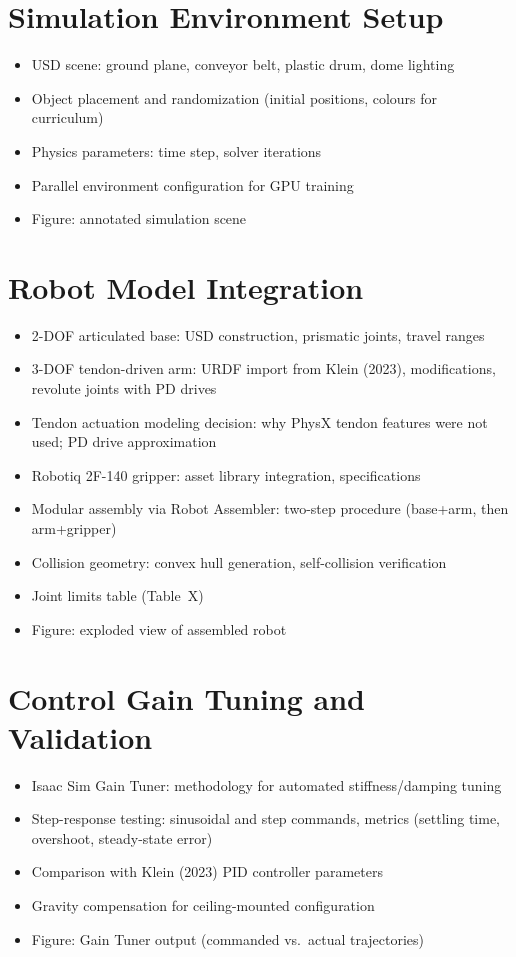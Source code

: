 \section{Simulation Environment Setup}
\begin{itemize}
    \item USD scene: ground plane, conveyor belt, plastic drum, dome lighting
    \item Object placement and randomization (initial positions, colours for curriculum)
    \item Physics parameters: time step, solver iterations
    \item Parallel environment configuration for GPU training
    \item Figure: annotated simulation scene
\end{itemize}

\section{Robot Model Integration}
\begin{itemize}
    \item 2-DOF articulated base: USD construction, prismatic joints, travel ranges
    \item 3-DOF tendon-driven arm: URDF import from Klein (2023), modifications, revolute joints with PD drives
    \item Tendon actuation modeling decision: why PhysX tendon features were not used; PD drive approximation
    \item Robotiq 2F-140 gripper: asset library integration, specifications
    \item Modular assembly via Robot Assembler: two-step procedure (base+arm, then arm+gripper)
    \item Collision geometry: convex hull generation, self-collision verification
    \item Joint limits table (Table~X)
    \item Figure: exploded view of assembled robot
\end{itemize}

\section{Control Gain Tuning and Validation}
\begin{itemize}
    \item Isaac Sim Gain Tuner: methodology for automated stiffness/damping tuning
    \item Step-response testing: sinusoidal and step commands, metrics (settling time, overshoot, steady-state error)
    \item Comparison with Klein (2023) PID controller parameters
    \item Gravity compensation for ceiling-mounted configuration
    \item Figure: Gain Tuner output (commanded vs.\ actual trajectories)
\end{itemize}


